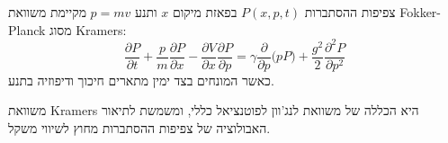 \documentclass{tstextbook}
\begin{document}
\begin{proposition}
צפיפות ההסתברות \(P(x,p,t)\) בפאזת מיקום \(x\) ותנע \(p=m v\) מקיימת משוואת Fokker-Planck מסוג Kramers:
$$\frac{\partial P}{\partial t} + \frac{p}{m}\frac{\partial P}{\partial x} - \frac{\partial V}{\partial x}\frac{\partial P}{\partial p}= \gamma \frac{\partial}{\partial p}\bigl(p P\bigr) + \frac{g^{2}}{2}\frac{\partial^{2}P}{\partial p^{2}}
$$
כאשר המונחים בצד ימין מתארים חיכוך ודיפוזיה בתנע.

\end{proposition}
\begin{remark}
משוואת Kramers היא הכללה של משוואת לנג'וון לפוטנציאל כללי, ומשמשת לתיאור האבולוציה של צפיפות ההסתברות מחוץ לשיווי משקל.

\end{remark}
\end{document}
